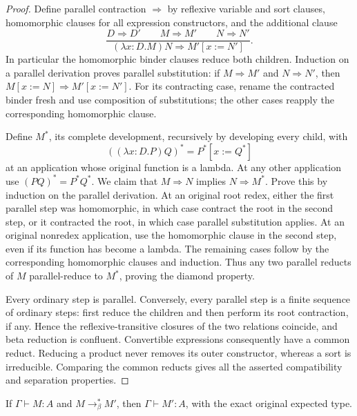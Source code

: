 \begin{proof}
Define parallel contraction $\Rightarrow$ by reflexive variable and
sort clauses, homomorphic clauses for all expression constructors, and
the additional clause
\[
 \frac{D\Rightarrow D'\qquad M\Rightarrow M'\qquad N\Rightarrow N'}
      {(\lambda x:D.M)N\Rightarrow M'[x:=N']}.
\]
In particular the homomorphic binder clauses reduce both children.
Induction on a parallel derivation proves parallel substitution:
if $M\Rightarrow M'$ and $N\Rightarrow N'$, then
$M[x:=N]\Rightarrow M'[x:=N']$. For its contracting case, rename
the contracted binder fresh and use composition of substitutions;
the other cases reapply the corresponding homomorphic clause.

Define $M^*$, its complete development, recursively by developing every
child, with
\[
 ((\lambda x:D.P)Q)^*=P^*[x:=Q^*]
\]
at an application whose original function is a lambda. At any other
application use $(PQ)^*=P^*Q^*$. We claim that
$M\Rightarrow N$ implies $N\Rightarrow M^*$. Prove this by induction
on the parallel derivation. At an original root redex, either the
first parallel step was homomorphic, in which case contract the root
in the second step, or it contracted the root, in which case parallel
substitution applies. At an original nonredex application, use the
homomorphic clause in the second step, even if its function has become
a lambda. The remaining cases follow by the corresponding
homomorphic clauses and induction. Thus any two parallel reducts of
$M$ parallel-reduce to $M^*$, proving the diamond property.

Every ordinary step is parallel. Conversely, every parallel step is
a finite sequence of ordinary steps: first reduce the children and
then perform its root contraction, if any. Hence the reflexive-transitive
closures of the two relations coincide, and beta reduction is confluent.
Convertible expressions consequently have a common reduct. Reducing
a product never removes its outer constructor, whereas a sort is
irreducible. Comparing the common reducts gives all the asserted
compatibility and separation properties.
\end{proof}

\begin{lemma}\label{pts:subject-reduction}
If $\Gamma\vdash M:A$ and $M\to_\beta^*M'$, then
$\Gamma\vdash M':A$, with the exact original expected type.
\end{lemma}

